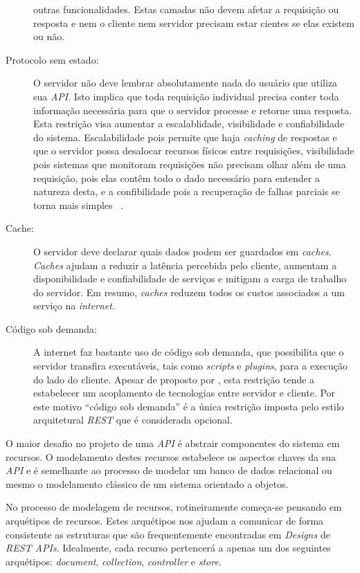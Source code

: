 \begin{description}
  outras funcionalidades. Estas camadas não devem afetar a requisição ou resposta e nem o cliente 
  nem servidor precisam estar cientes se elas existem ou não.
\item[Protocolo sem estado:] O servidor não deve lembrar absolutamente nada do usuário que 
  utiliza sua \emph{API}. Isto implica que toda requisição individual precisa conter toda 
  informação necessária para que o servidor processe e retorne uma resposta. Esta restrição 
  visa aumentar a escalablidade, visibilidade e confiabilidade do sistema. Escalabilidade pois 
  permite que haja \emph{caching} de respostas e que o servidor possa desalocar recursos 
  físicos entre requisições, visibilidade pois sistemas que monitoram requisições não 
  precisam olhar além de uma requisição, pois elas contêm todo o dado necessário 
  para entender a natureza desta, e a confibilidade pois a recuperação de falhas 
  parciais se torna mais simples \ \cite{kendall1994note}.
\item[Cache:] O servidor deve declarar quais dados podem ser guardados em \emph{caches}. 
  \emph{Caches} ajudam a reduzir a latência percebida pelo cliente, aumentam a disponibilidade 
  e confiabilidade de serviços e mitigam a carga de trabalho do servidor. Em resumo, 
  \emph{caches} reduzem todos os custos associados a um serviço na \emph{internet}.
\item[Código sob demanda:] A internet faz bastante uso de código sob demanda, que possibilita 
  que o servidor transfira executáveis, tais como \emph{scripts} e \emph{plugins}, para a 
  execução do lado do cliente. Apesar de proposto por , 
  esta restrição tende a estabelecer um acoplamento de tecnologias entre servidor e cliente. 
  Por este motivo ``código sob demanda'' é a única restrição imposta pelo estilo arquitetural 
  \emph{REST} que é considerada opcional.
\end{description}

O maior desafio no projeto de uma \emph{API} é abstrair componentes do sistema
em recursos. O modelamento destes recursos estabelece os aspectos chaves da sua \emph{API}
e é semelhante ao processo de modelar um banco de dados relacional ou mesmo o modelamento 
clássico de um sistema orientado a objetos.

No processo de modelagem de recursos, rotineiramente começa-se pensando em arquétipos de 
recursos. Estes arquétipos nos ajudam a  comunicar de forma consistente 
as estruturas que são frequentemente encontradas em \emph{Designs} de \emph{REST APIs}.
Idealmente, cada recurso pertencerá a apenas um dos seguintes arquétipos: \emph{document}, 
\emph{collection}, \emph{controller} e \emph{store}.

